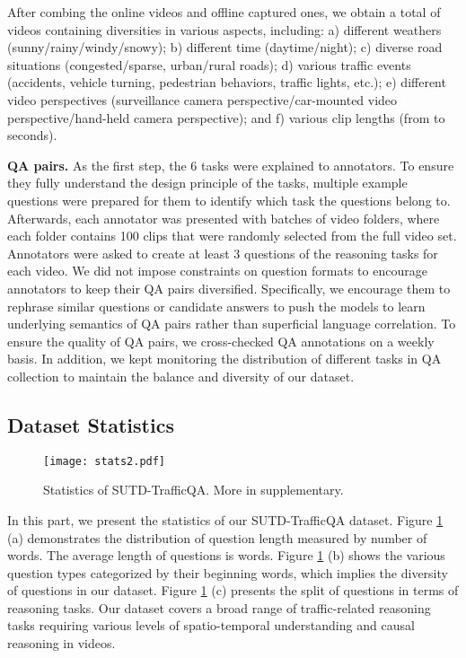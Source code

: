 \documentclass[final]{cvpr}
\begin{document}
After combing the online videos and offline captured ones, we obtain a total of  videos containing diversities in various aspects, including: a) different weathers (sunny/rainy/windy/snowy); b) different time (daytime/night); c) diverse road situations (congested/sparse, urban/rural roads); d) various traffic events (accidents, vehicle turning, pedestrian behaviors, traffic lights, etc.); e) different video perspectives (surveillance camera perspective/car-mounted video perspective/hand-held camera perspective); and f) various clip lengths (from  to  seconds).


{\bf QA pairs.} As the first step, the 6 tasks were explained to annotators. To ensure they fully understand the design principle of the tasks, multiple example questions were prepared for them to identify which task the questions belong to. Afterwards, each annotator was presented with batches of video folders, where each folder contains 100 clips that were randomly selected from the full video set. Annotators were asked to create at least 3 questions of the reasoning tasks for each video.
We did not impose constraints on question formats to encourage annotators to keep their QA pairs diversified. Specifically, we encourage them to rephrase similar questions or candidate answers to push the models to learn underlying semantics of QA pairs rather than superficial language correlation. 
To ensure the quality of QA pairs, we cross-checked QA annotations on a weekly basis. 
In addition, we kept monitoring the distribution of different tasks in QA collection to maintain the balance and diversity of our dataset.

\subsection{Dataset Statistics}

\begin{figure}[h]
\begin{center}
    \texttt{[image: stats2.pdf]}
\end{center}
\vspace{-0.4cm}
\caption{Statistics of SUTD-TrafficQA. More in supplementary.
}
\label{fig:Dataset_stats}
\vspace{-0.2cm}
\end{figure}

In this part, we present the statistics of our SUTD-TrafficQA dataset. Figure \ref{fig:Dataset_stats} (a) demonstrates the distribution of question length measured by number of words. The average length of questions is  words. Figure \ref{fig:Dataset_stats} (b) shows the various question types categorized by their beginning words, which implies the diversity of questions in our dataset.
Figure \ref{fig:Dataset_stats} (c) presents the split of questions in terms of reasoning tasks.  Our dataset covers a broad range of traffic-related reasoning tasks requiring various levels of spatio-temporal understanding and causal reasoning in videos. 
\end{document}
